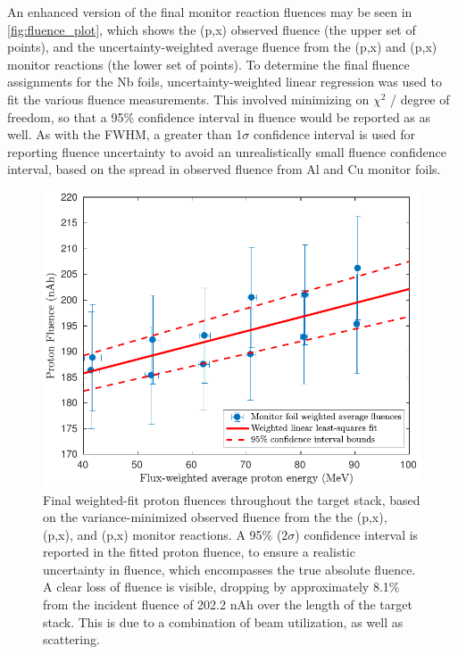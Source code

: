 \documentclass[3p]{elsarticle}
\begin{document}
An enhanced version of the final monitor reaction fluences may be seen in \autoref{fig:fluence_plot}, which shows the  (p,x) observed fluence (the upper set of points), and the uncertainty-weighted average fluence from the  (p,x) and (p,x) monitor reactions (the lower set of points).
To determine the final fluence assignments for the Nb foils, uncertainty-weighted linear regression was used to fit the various fluence measurements.
This involved minimizing on $\chi^2$ / degree of freedom, so that  a 95\% confidence interval in fluence would be reported as as well.
As with the FWHM, a greater than 1$\sigma$ confidence interval is used for reporting fluence uncertainty to avoid an unrealistically small fluence confidence interval, based on the spread in observed fluence from Al and Cu monitor foils.



\begin{figure}
 \centering
 \includegraphics[scale=.8]{./figures/fluence_plot.pdf}
 \caption{Final weighted-fit proton fluences throughout the target stack, based on the variance-minimized observed fluence from the the  (p,x), (p,x), and (p,x) monitor reactions. A 95\% ($2\sigma$) confidence interval is reported in the fitted proton fluence, to ensure a realistic uncertainty in fluence, which encompasses the true absolute fluence. A clear loss of fluence  is visible, dropping by approximately 8.1\% from the incident fluence of 202.2 nAh over the length of the target stack.  This is due to a combination of beam utilization, as well as scattering.}
 \label{fig:fluence_plot}
\end{figure}
\end{document}
